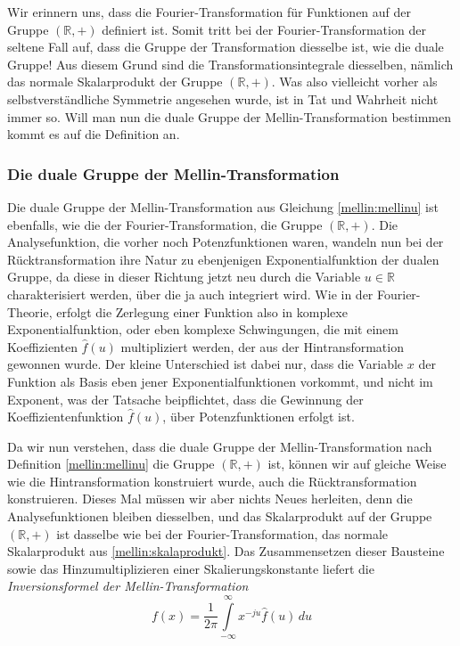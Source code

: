 Wir erinnern uns, dass die Fourier-Transformation für Funktionen auf der 
Gruppe $(\mathbb{R},+)$ definiert ist. 
Somit tritt bei der Fourier-Transformation der seltene Fall auf, dass die 
Gruppe der Transformation diesselbe ist, wie die duale Gruppe!
Aus diesem Grund sind die Transformationsintegrale diesselben, nämlich das 
normale Skalarprodukt der Gruppe $(\mathbb{R},+)$.
Was also vielleicht vorher als selbstverständliche Symmetrie angesehen 
wurde, ist in Tat und Wahrheit nicht immer so.
Will man nun die duale Gruppe der Mellin-Transformation bestimmen kommt 
es auf die Definition an. 

\subsubsection{Die duale Gruppe der Mellin-Transformation}
Die duale Gruppe der Mellin-Transformation aus Gleichung 
\eqref{mellin:mellinu} ist ebenfalls, wie die der Fourier-Transformation, 
die Gruppe $(\mathbb{R},+)$.
Die Analysefunktion, die vorher noch Potenzfunktionen waren, wandeln nun 
bei der Rücktransformation ihre Natur zu ebenjenigen Exponentialfunktion
der dualen Gruppe, da diese in dieser Richtung jetzt neu durch die Variable 
$u \in \mathbb{R}$ charakterisiert werden, über die ja auch integriert wird.
Wie in der Fourier-Theorie, erfolgt die Zerlegung einer Funktion also in 
komplexe Exponentialfunktion, oder eben komplexe Schwingungen, die mit 
einem Koeffizienten $\hat{f}(u)$ multipliziert werden, der aus der 
Hintransformation gewonnen wurde.
Der kleine Unterschied ist dabei nur, dass die Variable $x$ der Funktion 
als Basis eben jener Exponentialfunktionen vorkommt, und nicht im Exponent, 
was der Tatsache beipflichtet, dass die Gewinnung der Koeffizientenfunktion 
$\hat{f}(u)$, über Potenzfunktionen erfolgt ist.

Da wir nun verstehen, dass die duale Gruppe der Mellin-Transformation nach 
Definition \eqref{mellin:mellinu} die Gruppe $(\mathbb{R},+)$ ist, können 
wir auf gleiche Weise wie die Hintransformation konstruiert wurde, auch 
die Rücktransformation konstruieren.
Dieses Mal müssen wir aber nichts Neues herleiten, denn die 
Analysefunktionen bleiben diesselben, und das Skalarprodukt auf der Gruppe 
$(\mathbb{R},+)$ ist dasselbe wie bei der Fourier-Transformation, das 
normale Skalarprodukt aus \eqref{mellin:skalaprodukt}. 
Das Zusammensetzen dieser Bausteine sowie das Hinzumultiplizieren einer 
Skalierungskonstante liefert die {\em Inversionsformel der Mellin-Transformation}
\begin{equation}
    f(x) = 
    \frac{1}{2\pi} \int\limits_{-\infty}^{\infty} 
    x^{-ju} \hat{f}(u) \,{d}u
    \label{mellin:mellininvu}
\end{equation}

